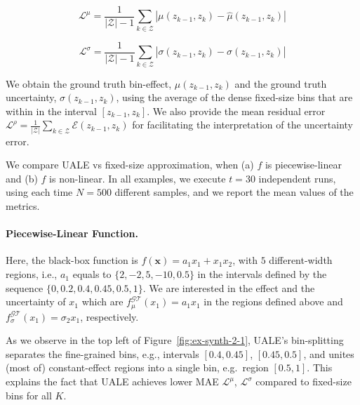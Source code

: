 \documentclass[twoside]{article}
\begin{document}
\begin{equation}
  \label{eq:eval_met_1}
  \mathcal{L}^{\mu} = \frac{1}{|\mathcal{Z}| - 1} \sum_{k \in
  \mathcal{Z}} | \mu(z_{k-1}, z_k) - \hat{\mu}(z_{k-1}, z_k) |
\end{equation}


\begin{equation}
  \label{eq:eval_met_2}
  \mathcal{L}^{\sigma} = \frac{1}{|\mathcal{Z}| -1} \sum_{k \in
    \mathcal{Z}} | \sigma(z_{k-1}, z_k) - \hat{\sigma}(z_{k-1}, z_k) |
\end{equation}

We obtain the ground truth bin-effect, \(\mu(z_{k-1}, z_k)\) and the
ground truth uncertainty, \(\sigma(z_{k-1}, z_k)\), using the average
of the dense fixed-size bins that are within in the interval
\([z_{k-1}, z_k]\). We also provide the mean residual error
\(\mathcal{L}^{\rho} = \frac{1}{|\mathcal{Z}|} \sum_{k \in
  \mathcal{Z}} \mathcal{E}(z_{k-1}, z_k) \) for facilitating the
interpretation of the uncertainty error.


We compare UALE vs fixed-size approximation, when (a) \(f\) is
piecewise-linear and (b) \(f\) is non-linear. In all examples, we
execute \(t = 30\) independent runs, using each time \(N=500\)
different samples, and we report the mean values of the metrics.

\paragraph{Piecewise-Linear Function.}

Here, the black-box function is \(f(\mathbf{x}) = a_1x_1 + x_1x_2\),
with \(5\) different-width regions, i.e., \(a_1\) equals to
\(\{2, -2, 5, -10, 0.5\}\) in the intervals defined by the sequence
\(\{0, 0.2, 0.4, 0.45, 0.5, 1\}\). We are interested in the effect and
the uncertainty of \(x_1\) which are
\(f^{\mathcal{GT}}_{\mu}(x_1) = a_1x_1\) in the regions defined above
and \(f^{\mathcal{GT}}_{\sigma}(x_1) = \sigma_2 x_1\), respectively.

As we observe in the top left of Figure~\ref{fig:ex-synth-2-1}, UALE's
bin-splitting separates the fine-grained bins, e.g., intervals
\([0.4, 0.45]\), \([0.45, 0.5]\), and unites (most of) constant-effect
regions into a single bin, e.g.~region \([0.5, 1]\). This explains the
fact that UALE achieves lower MAE \(\mathcal{L}^{\mu}\),
\(\mathcal{L}^{\sigma}\) compared to fixed-size bins for all \(K\).
\end{document}
